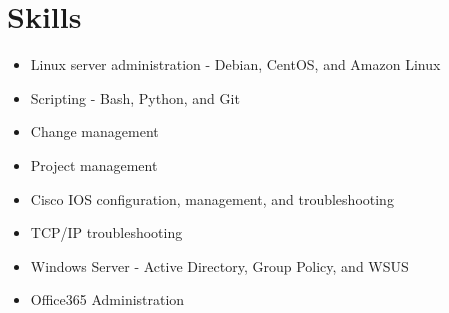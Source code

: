 \documentclass[letterpaper,11pt]{article}
\newcommand{\resumeItem}[2]{
  \item\small{
    \textbf{}{#2 \vspace{-2pt}}
  }
}
\newcommand{\resumeSubItem}[2]{\resumeItem{#1}{#2}\vspace{-4pt}}
\newcommand{\resumeSubHeadingListStart}{\begin{itemize}[leftmargin=*]}
\newcommand{\resumeSubHeadingListEnd}{\end{itemize}}
\begin{document}
\section{Skills}
  \resumeSubHeadingListStart
    \resumeSubItem{}
      {Linux server administration - Debian, CentOS, and Amazon Linux}
    \resumeSubItem{}
      {Scripting - Bash, Python, and Git}
    \resumeSubItem{}
      {Change management}
    \resumeSubItem{}
      {Project management}
    \resumeSubItem{}
      {Cisco IOS configuration, management, and troubleshooting}
    \resumeSubItem{}
      {TCP/IP troubleshooting}
    \resumeSubItem{}
      {Windows Server - Active Directory, Group Policy, and WSUS}
    \resumeSubItem{}
      {Office365 Administration}
  \resumeSubHeadingListEnd
\end{document}
